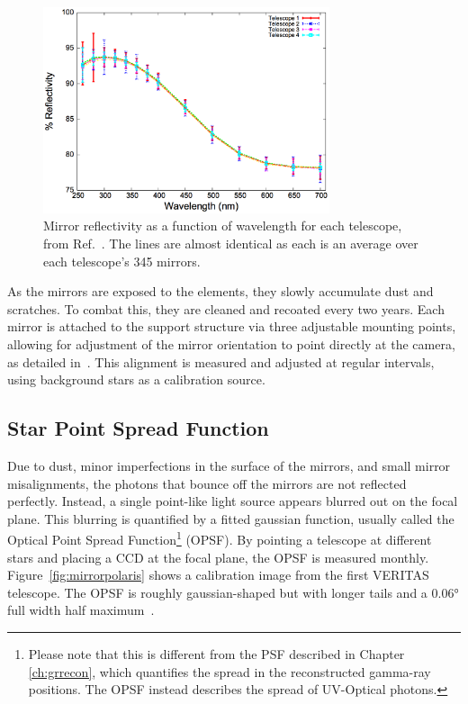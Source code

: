 \begin{figure}[ht]
  \centering
  \includegraphics[width=0.75\textwidth]{images/mirror_reflect}
  \caption[Mirror Reflectivity]{
    Mirror reflectivity as a function of wavelength for each telescope, from Ref.~\cite{mirrorfacets}. 
    The lines are almost identical as each is an average over each telescope's 345 mirrors.
  }
  \label{fig:mirreflect}
\end{figure}

As the mirrors are exposed to the elements, they slowly accumulate dust and scratches.
To combat this, they are cleaned and recoated every two years.
Each mirror is attached to the support structure via three adjustable mounting points, allowing for adjustment of the mirror orientation to point directly at the camera, as detailed in~\cite{mirroralign}.
This alignment is measured and adjusted at regular intervals, using background stars as a calibration source.

\subsection{Star Point Spread Function}

Due to dust, minor imperfections in the surface of the mirrors, and small mirror misalignments, the photons that bounce off the mirrors are not reflected perfectly.
Instead, a single point-like light source appears blurred out on the focal plane.
This blurring is quantified by a fitted gaussian function, usually called the Optical Point Spread Function\footnote{Please note that this is different from the PSF described in Chapter \ref{ch:grrecon}, which quantifies the spread in the reconstructed gamma-ray positions.  The OPSF instead describes the spread of UV-Optical photons.} (OPSF).
By pointing a telescope at different stars and placing a CCD at the focal plane, the OPSF is measured monthly.
Figure~\ref{fig:mirrorpolaris} shows a calibration image from the first VERITAS telescope.
The OPSF is roughly gaussian-shaped but with longer tails and a $ \ang{0.06} $ full width half maximum~\cite{Veritas_Detector}.

